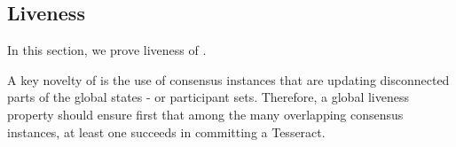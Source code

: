 
\subsection{Liveness}
\label{subsec:liveness}

In this section, we prove liveness of \codename{}.

A key novelty of \codename{} is the use of consensus instances that are updating disconnected parts of the global states - or participant sets. Therefore, a global liveness property should ensure first that among the many overlapping consensus instances, at least one succeeds in committing a Tesseract.

